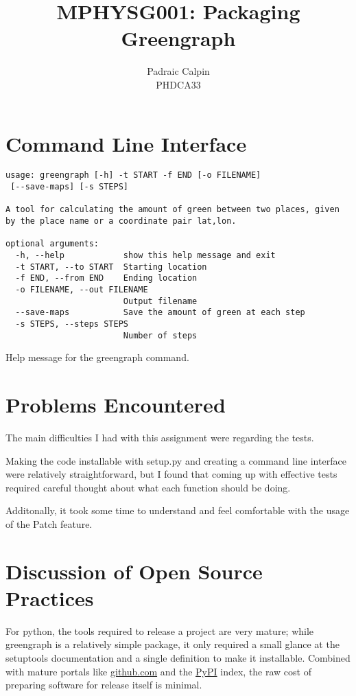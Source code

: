 \documentclass[12pt,a4paper]{article}
\begin{document}
\title{MPHYSG001: Packaging Greengraph}
\author{Padraic Calpin \\ PHDCA33}
\maketitle

\section*{Command Line Interface}
\begin{listing*}
\begin{verbatim}
usage: greengraph [-h] -t START -f END [-o FILENAME]
 [--save-maps] [-s STEPS]

A tool for calculating the amount of green between two places, given 
by the place name or a coordinate pair lat,lon.

optional arguments:
  -h, --help            show this help message and exit
  -t START, --to START  Starting location
  -f END, --from END    Ending location
  -o FILENAME, --out FILENAME
                        Output filename
  --save-maps           Save the amount of green at each step
  -s STEPS, --steps STEPS
                        Number of steps
\end{verbatim}
\caption{Help message for the greengraph command.}
\end{listing*}

\section*{Problems Encountered}
The main difficulties I had with this assignment were regarding the tests. 

Making the code installable with setup.py and creating a command line interface were relatively straightforward, but I found that coming up with effective tests required careful thought about what each function should be doing. 

Additonally, it took some time to understand and feel comfortable with the usage of the Patch feature.

\pagebreak

\section*{Discussion of Open Source Practices}
For python, the tools required to release a project are very mature; while greengraph is a relatively simple package, it only required a small glance at the setuptools documentation and a single definition to make it installable. Combined with mature portals like \url{github.com} and the \href{https://pypi.python.org/pypi}{PyPI} index, the raw cost of preparing software for release itself is minimal. 
\end{document}
